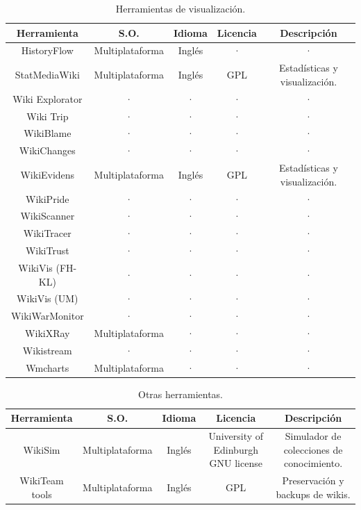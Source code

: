 \documentclass[11pt,onecolumn]{article}
\begin{document}
\begin{table}
\centering
\begin{tabular}{| c | c | c | c | c |}
\hline
\textbf{Herramienta} & \textbf{S.O.} & \textbf{Idioma} & \textbf{Licencia} & \textbf{Descripción} \\
\hline
HistoryFlow & Multiplataforma & Inglés & · & · \\ \hline 
StatMediaWiki & Multiplataforma & Inglés & GPL & Estadísticas y visualización. \\ \hline 
Wiki Explorator & · & · & · & · \\ \hline 
Wiki Trip & · & · & · & · \\ \hline 
WikiBlame & · & · & · & · \\ \hline 
WikiChanges & · & · & · & · \\ \hline 
WikiEvidens & Multiplataforma & Inglés & GPL & Estadísticas y visualización. \\ \hline 
WikiPride & · & · & · & · \\ \hline 
WikiScanner & · & · & · & · \\ \hline 
WikiTracer & · & · & · & · \\ \hline 
WikiTrust & · & · & · & · \\ \hline 
WikiVis (FH-KL) & · & · & · & · \\ \hline 
WikiVis (UM) & · & · & · & · \\ \hline 
WikiWarMonitor & · & · & · & · \\ \hline 
WikiXRay & Multiplataforma & · & · & · \\ \hline 
Wikistream & · & · & · & · \\ \hline 
Wmcharts & Multiplataforma & · & · & · \\ \hline 
\end{tabular}
\caption{Herramientas de visualización.}
\label{tab:visualizationtoolstable}
\end{table}


\begin{table}
\centering
\begin{tabular}{| c | c | c | c | c |}
\hline
\textbf{Herramienta} & \textbf{S.O.} & \textbf{Idioma} & \textbf{Licencia} & \textbf{Descripción} \\
\hline
WikiSim & Multiplataforma & Inglés & University of Edinburgh GNU license & Simulador de colecciones de conocimiento. \\ \hline 
WikiTeam tools & Multiplataforma & Inglés & GPL & Preservación y backups de wikis. \\ \hline 
\end{tabular}
\caption{Otras herramientas.}
\label{tab:othertoolstable}
\end{table}
\end{document}
